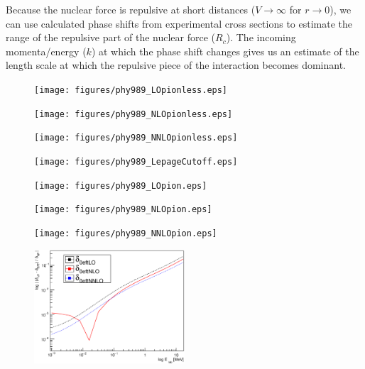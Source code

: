 \documentclass[10pt,showpacs,preprintnumbers,footinbib,amsmath,amssymb,aps,prl,twocolumn,groupedaddress,superscriptaddress,showkeys]{revtex4-1}
\begin{document}
Because the nuclear force is repulsive at short distances ($V \rightarrow \infty$ for $r \rightarrow 0$),
we can use calculated phase shifts from experimental cross sections to estimate the range
of the repulsive part of the nuclear force ($R_c$). The incoming momenta/energy ($k$) at which the
phase shift changes gives us an estimate of the length scale at which the repulsive piece of the
interaction becomes dominant.

\begin{figure}
\centering
	\texttt{[image: figures/phy989\_LOpionless.eps]}
	\caption{}
	\label{fig:LOpionless}
\end{figure}


\begin{figure}
\centering
	\texttt{[image: figures/phy989\_NLOpionless.eps]}
	\caption{}
	\label{fig:NLOpionless}
\end{figure}


\begin{figure}
\centering
	\texttt{[image: figures/phy989\_NNLOpionless.eps]}
	\caption{}
	\label{fig:NNLOpionless}
\end{figure}


\begin{figure}
\centering
	\texttt{[image: figures/phy989\_LepageCutoff.eps]}
	\caption{}
	\label{fig:LepageCutoff}
\end{figure}

\clearpage



\begin{figure}
\centering
	\texttt{[image: figures/phy989\_LOpion.eps]}
	\caption{}
	\label{fig:LOpion}
\end{figure}


\begin{figure}
\centering
	\texttt{[image: figures/phy989\_NLOpion.eps]}
	\caption{}
	\label{fig:NLOpion}
\end{figure}


\begin{figure}
\centering
	\texttt{[image: figures/phy989\_NNLOpion.eps]}
	\caption{}
	\label{fig:NNLOpion}
\end{figure}

\begin{figure}
\centering
	\includegraphics[width=0.5\textwidth]{figures/phy989_OnePionLepage.eps}
	\caption{}
	\label{fig:OnePionLepage}
\end{figure}
\end{document}
